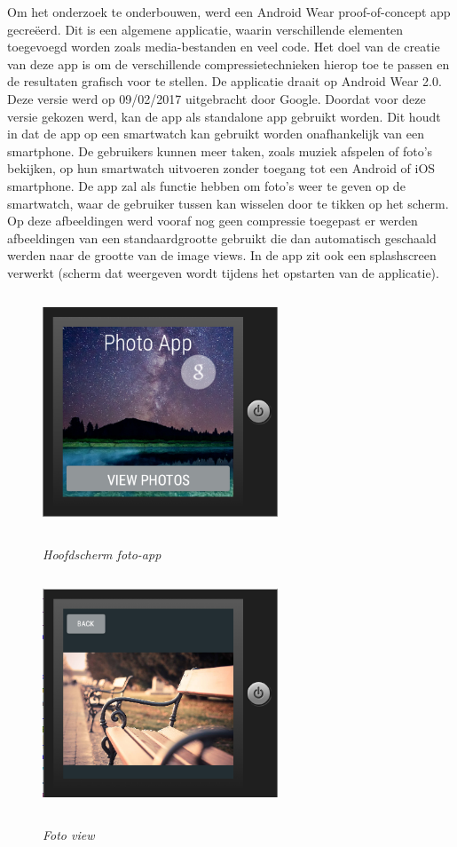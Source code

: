 Om het onderzoek te onderbouwen, werd een Android Wear proof-of-concept app gecreëerd. Dit is een algemene applicatie, waarin verschillende elementen toegevoegd worden zoals media-bestanden en veel code. Het doel van de creatie van deze app is om de verschillende compressietechnieken hierop toe te passen en de resultaten grafisch voor te stellen. De applicatie draait op Android Wear 2.0. Deze versie werd op 09/02/2017 uitgebracht door Google.\autocite{Google} Doordat voor deze versie gekozen werd, kan de app als standalone app gebruikt worden. Dit houdt in dat de app op een smartwatch kan gebruikt worden onafhankelijk van een smartphone. De gebruikers kunnen meer taken, zoals muziek afspelen of foto's bekijken, op hun smartwatch uitvoeren zonder toegang tot een Android of iOS smartphone. De app zal als functie hebben om foto's weer te geven op de smartwatch, waar de gebruiker tussen kan wisselen door te tikken op het scherm. Op deze afbeeldingen werd vooraf nog geen compressie toegepast er werden afbeeldingen van een standaardgrootte gebruikt die dan automatisch geschaald werden naar de grootte van de image views. In de app zit ook een splashscreen verwerkt (scherm dat weergeven wordt tijdens het opstarten van de applicatie). 
\begin{figure}[H]
	\centering
	\caption{\textit{Hoofdscherm foto-app}}
	\includegraphics[width=7cm, height=7cm, keepaspectratio]{img/photoappmain}\\[.5cm]
\end{figure}
\begin{figure}[H]
	\centering
	\caption{\textit{Foto view}}
	\includegraphics[width=7cm, height=7cm, keepaspectratio]{img/photoappgallery}\\[.5cm]
	
\end{figure}

